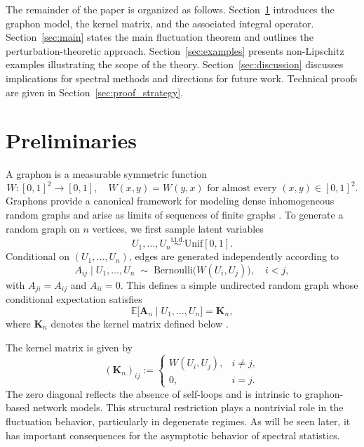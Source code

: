 \documentclass[11pt]{article}
\theoremstyle{plain}
\theoremstyle{remark}
\begin{document}
The remainder of the paper is organized as follows. Section~\ref{sec:prelim} introduces the 
graphon model, the kernel matrix, and the associated integral operator. Section~\ref{sec:main} 
states the main fluctuation theorem and outlines the perturbation-theoretic approach. 
Section~\ref{sec:examples} presents non-Lipschitz examples illustrating the scope of the theory. 
Section~\ref{sec:discussion} discusses implications for spectral methods and directions for future 
work. Technical proofs are given in Section~\ref{sec:proof_strategy}.


\section{Preliminaries}
\label{sec:prelim}

A graphon is a measurable symmetric function
\begin{equation}
W : [0,1]^2 \to [0,1], \quad W(x,y)=W(y,x) \text{ for almost every } (x,y)\in[0,1]^2.
\label{eq:graphon_def}
\end{equation}
Graphons provide a canonical framework for modeling dense inhomogeneous random graphs and arise as limits of sequences of finite graphs
\citep{lovasz2006limits,lovasz2012large,borgs2008convergent,borgs2012convergent}.
To generate a random graph on $n$ vertices, we first sample latent variables
\begin{equation}
U_1,\dots,U_n \stackrel{\mathrm{i.i.d.}}{\sim} \mathrm{Unif}[0,1].
\label{eq:latent_vars}
\end{equation}
Conditional on $(U_1,\dots,U_n)$, edges are generated independently according to
\begin{equation}
A_{ij} \mid U_1,\dots,U_n \;\sim\; \mathrm{Bernoulli}\bigl(W(U_i,U_j)\bigr), \quad i<j,
\label{eq:edge_generation}
\end{equation}
with $A_{ji}=A_{ij}$ and $A_{ii}=0$.
This defines a simple undirected random graph whose conditional expectation satisfies
\begin{equation}
\mathbb{E}\bigl[\mathbf{A}_n \mid U_1,\dots,U_n\bigr] = \mathbf{K}_n,
\label{eq:conditional_mean}
\end{equation}
where $\mathbf{K}_n$ denotes the kernel matrix defined below
\citep{bickel2009nonparametric,wolfe2013nonparametric,chatterjee2015matrix}.

The kernel matrix is given by
\begin{equation}
(\mathbf{K}_n)_{ij} :=
\begin{cases}
W(U_i,U_j), & i\neq j,\\
0, & i=j.
\end{cases}
\label{eq:kernel_matrix}
\end{equation}
The zero diagonal reflects the absence of self-loops and is intrinsic to graphon-based network models.
This structural restriction plays a nontrivial role in the fluctuation behavior, particularly in degenerate regimes.
As will be seen later, it has important consequences for the asymptotic behavior of spectral statistics.
\end{document}
